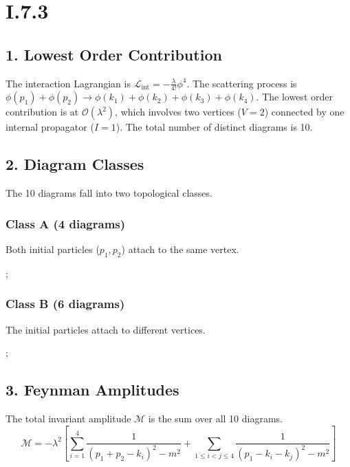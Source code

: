 \documentclass{article}
\begin{document}
\section*{I.7.3}

\subsection*{1. Lowest Order Contribution}
The interaction Lagrangian is $\mathcal{L}_{\text{int}} = -\frac{\lambda}{4!} \phi^4$. The scattering process is $\phi(p_1) + \phi(p_2) \rightarrow \phi(k_1) + \phi(k_2) + \phi(k_3) + \phi(k_4)$. The lowest order contribution is at $\mathcal{O}(\lambda^2)$, which involves two vertices ($V=2$) connected by one internal propagator ($I=1$). The total number of distinct diagrams is 10.

\subsection*{2. Diagram Classes}
The 10 diagrams fall into two topological classes.

\subsubsection*{Class A (4 diagrams)}
Both initial particles ($p_1, p_2$) attach to the same vertex.
\begin{center}
    ;
\end{center}

\subsubsection*{Class B (6 diagrams)}
The initial particles attach to different vertices.
\begin{center}
    ;
\end{center}

\subsection*{3. Feynman Amplitudes}
The total invariant amplitude $\mathcal{M}$ is the sum over all 10 diagrams.
$$ \mathcal{M} = -\lambda^2 \left[ \sum_{i=1}^4 \frac{1}{(p_1 + p_2 - k_i)^2 - m^2} + \sum_{1 \le i < j \le 4} \frac{1}{(p_1 - k_i - k_j)^2 - m^2} \right] $$
\end{document}
